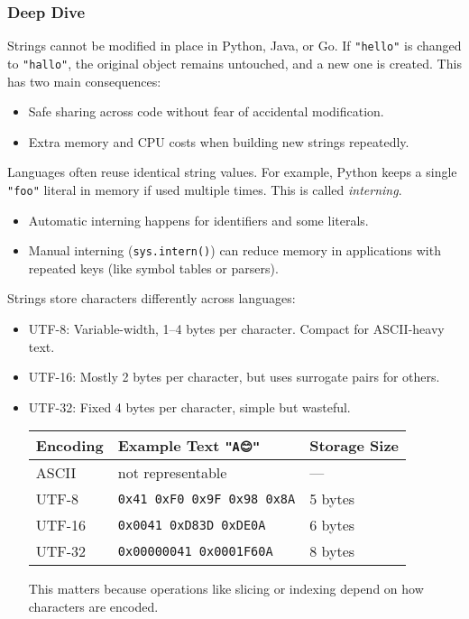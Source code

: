 \documentclass[
  letterpaper,
  DIV=11,
  numbers=noendperiod]{scrreprt}
\providecommand{\tightlist}{%
  \setlength{\itemsep}{0pt}\setlength{\parskip}{0pt}}
\begin{document}
\subsubsection{Deep Dive}\label{deep-dive-23}

Strings cannot be modified in place in Python, Java, or Go. If
\texttt{"hello"} is changed to \texttt{"hallo"}, the original object
remains untouched, and a new one is created. This has two main
consequences:

\begin{itemize}
\tightlist
\item
  Safe sharing across code without fear of accidental modification.
\item
  Extra memory and CPU costs when building new strings repeatedly.
\end{itemize}

Languages often reuse identical string values. For example, Python keeps
a single \texttt{"foo"} literal in memory if used multiple times. This
is called \emph{interning}.

\begin{itemize}
\tightlist
\item
  Automatic interning happens for identifiers and some literals.
\item
  Manual interning (\texttt{sys.intern()}) can reduce memory in
  applications with repeated keys (like symbol tables or parsers).
\end{itemize}

Strings store characters differently across languages:

\begin{itemize}
\item
  UTF-8: Variable-width, 1--4 bytes per character. Compact for
  ASCII-heavy text.
\item
  UTF-16: Mostly 2 bytes per character, but uses surrogate pairs for
  others.
\item
  UTF-32: Fixed 4 bytes per character, simple but wasteful.

  \begin{longtable}[]{@{}lll@{}}
  \toprule\noalign{}
  Encoding & Example Text \texttt{"A😊"} & Storage Size \\
  \midrule\noalign{}
  \endhead
  \bottomrule\noalign{}
  \endlastfoot
  ASCII & not representable & --- \\
  UTF-8 & \texttt{0x41\ 0xF0\ 0x9F\ 0x98\ 0x8A} & 5 bytes \\
  UTF-16 & \texttt{0x0041\ 0xD83D\ 0xDE0A} & 6 bytes \\
  UTF-32 & \texttt{0x00000041\ 0x0001F60A} & 8 bytes \\
  \end{longtable}

  This matters because operations like slicing or indexing depend on how
  characters are encoded.
\end{itemize}
\end{document}
